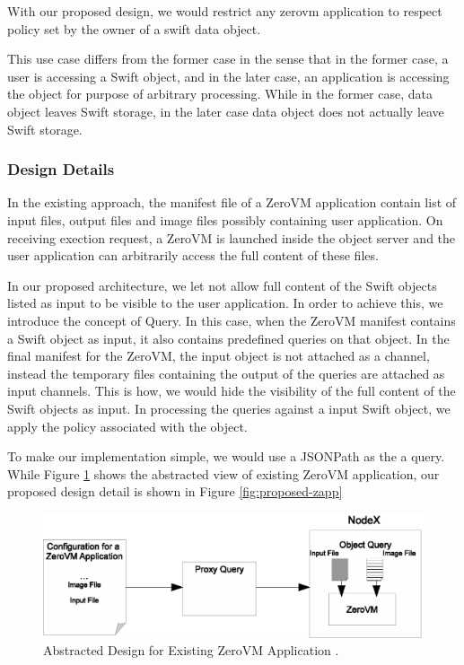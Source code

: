 \begin{appendices}
With our proposed design, we would restrict any zerovm application to respect policy set by the owner of a swift data object.

This use case differs from the former case  in the sense that in the former case, a user is accessing a Swift object, and in the later case, an application is accessing the object for purpose of arbitrary processing. While in the former case, data object leaves Swift storage, in the later case data object does not actually leave Swift storage.

\subsubsection{Design Details} 
In the existing approach, the manifest file of a ZeroVM application contain list of input files, output files and image files possibly containing user application.  On receiving exection request, a ZeroVM is launched inside the object server and the user application can arbitrarily access the full content of these files. 

In our proposed architecture, we let not allow full content of the Swift objects listed as input to be visible to the user application. In order to achieve this, we introduce the concept of Query. In this case,  when the ZeroVM manifest contains a Swift object as input, it also contains predefined queries on that object.  In the final manifest for the ZeroVM, the input object is not attached as a channel, instead the temporary files containing the output of the queries are attached as input channels. This is how, we would hide the visibility of the full content of the Swift objects as input.  In processing the queries against a input Swift object, we apply the policy associated with the  object.

 To make our implementation simple, we would use a JSONPath as the a query. While Figure \ref{fig:abstracted-zapp} shows the abstracted view of existing ZeroVM application, our proposed design detail is shown in Figure \ref{fig:proposed-zapp}

\begin{figure}[t]
\centering
\includegraphics {eps/abstracted-zapp}
\caption{Abstracted Design for Existing ZeroVM Application .}
\label{fig:abstracted-zapp}
\end{figure}


\end{appendices}
